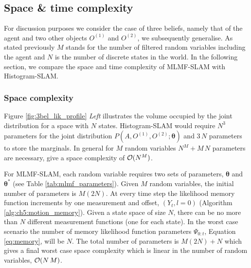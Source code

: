 \FloatBarrier
\subsection{Space \& time complexity}\label{ch5:space_time_complexity_MLMF}

For discussion purposes we consider the case of three beliefs, namely that of the agent and two other objects $O^{(1)}$ and $O^{(2)}$, we
subsequently generalise. As stated previously $M$ stands for the number of filtered random variables including the agent and
$N$ is the number of discrete states in the world. In the following section, we compare the space and time complexity 
of MLMF-SLAM with Histogram-SLAM.


\subsubsection{Space complexity}

Figure \ref{fig:3bel_lik_profile} \textit{Left} illustrates the volume occupied by the joint distribution
for a space with $N$ states. Histogram-SLAM would require $N^3$ parameters for the joint distribution 
$P(A,O^{(1)},O^{(2)};\boldsymbol{\theta})$ and $3\,N$ parameters to store the marginals. In general 
for $M$ random variables $N^{M} + M\, N$ parameters are necessary, give a space complexity of $\operatorname{\mathcal{O}}(N^M)$. 

For MLMF-SLAM, each random variable requires two sets of parameters, $\boldsymbol{\theta}$ and $\boldsymbol{\theta}^*$ 
(see Table \ref{tab:mlmf_parameters}). Given
$M$ random variables, the initial number of parameters is $M (2 N)$.
At every time step the likelihood memory function increments by one measurement and offset, $(Y_t,l=0)$ (Algorithm \ref{alg:ch5:motion_memory}).
Given a state space of size $N$, there can be no more than $N$ different measurement functions (one for each state). In
the worst case scenario the number of memory likelihood function parameters $\Psi_{0:t}$, Equation \ref{eq:memory}, will be $N$.
The total number of parameters is $M (2 N) + N$ which gives a final worst case space complexity which is linear in the number of 
random variables, $\operatorname{\mathcal{O}}(N\,M)$. 

